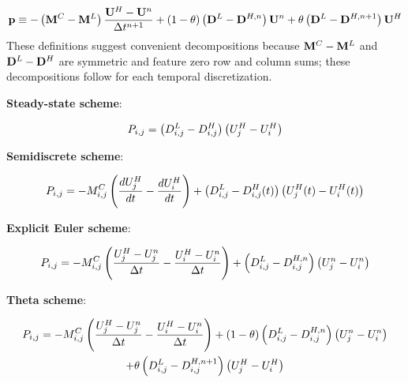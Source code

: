 \begin{equation}\label{eq:correction_flux_theta}
  \correctionfluxvector \equiv -\pr{\consistentmassmatrix
  - \lumpedmassmatrix}\frac{\highordersolution-\solutionvector^\timeindex}
    {\timestepsize^{\timeindex+1}}
  + (1-\theta)\pr{\loworderdiffusionmatrix
    - \highorderdiffusionmatrix[\timeindex]}\solutionvector^\timeindex 
  + \theta    \pr{\loworderdiffusionmatrix
    - \highorderdiffusionmatrix[\timeindex+1]}\highordersolution
\end{equation}
These definitions suggest convenient decompositions because
$\mathbf{M}^C-\mathbf{M}^L$ and
$\loworderdiffusionmatrix-\highorderdiffusionmatrix$ are symmetric
and feature zero row and column sums; these decompositions follow
for each temporal discretization.
\begin{center}{\textbf{Steady-state scheme}:}\end{center}
\begin{equation}
  \MakeUppercase{\correctionfluxletter}\ij
  = \pr{\diffusionmatrixletter\ij^L-\diffusionmatrixletter\ij^H}
    \pr{\solutionletter_j^H - \solutionletter_i^H}
\end{equation}
\begin{center}{\textbf{Semidiscrete scheme}:}\end{center}
\begin{equation}
  \MakeUppercase{\correctionfluxletter}\ij
  = -\massmatrixletter^C\ij\pr{\ddt{\solutionletter_j^H}
    - \ddt{\solutionletter_i^H}}
  + \pr{\diffusionmatrixletter\ij^L-\diffusionmatrixletter\ij^H(\timevalue)}
    \pr{\solutionletter_j^H(\timevalue) - \solutionletter_i^H(\timevalue)}
\end{equation}
\begin{center}{\textbf{Explicit Euler scheme}:}\end{center}
\begin{equation}
  \MakeUppercase{\correctionfluxletter}\ij
  = -\massmatrixletter^C\ij\pr{\frac{\solutionletter_j^H
    - \solutionletter_j^\timeindex}{\timestepsize}
    - \frac{\solutionletter_i^H - \solutionletter_i^\timeindex}
    {\timestepsize}}
  + \pr{\diffusionmatrixletter\ij^L-\diffusionmatrixletter\ij^{H,n}}
    \pr{\solutionletter_j^\timeindex - \solutionletter_i^\timeindex}
\end{equation}
\begin{center}{\textbf{Theta scheme}:}\end{center}
\begin{multline}
  \MakeUppercase{\correctionfluxletter}\ij
  = -\massmatrixletter^C\ij\pr{\frac{\solutionletter_j^H
    - \solutionletter_j^\timeindex}{\timestepsize}
    - \frac{\solutionletter_i^H - \solutionletter_i^\timeindex}
      {\timestepsize}}
  + (1-\theta)\pr{\diffusionmatrixletter\ij^L
    - \diffusionmatrixletter\ij^{H,\timeindex}}
    \pr{\solutionletter_j^\timeindex - \solutionletter_i^\timeindex}\\
  + \theta    \pr{\diffusionmatrixletter\ij^L
    - \diffusionmatrixletter\ij^{H,\timeindex+1}}
    \pr{\solutionletter_j^H - \solutionletter_i^H}
\end{multline}
